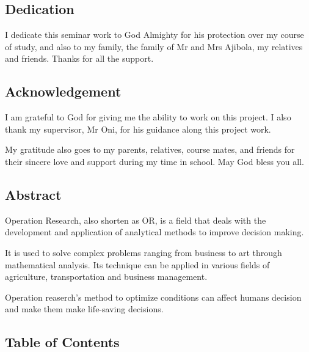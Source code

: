\documentclass{article}
\begin{document}
\newpage

\begin{center}
	\subsection{Dedication}
\end{center}


I dedicate this seminar work to God Almighty for his protection over my course of study, and also to my family, the family of Mr and Mrs Ajibola, my relatives and friends. Thanks for all the support.

\newpage

\begin{center}
	\subsection{Acknowledgement}
\end{center}

I am grateful to God for giving me the ability to work on this project. I also thank my supervisor, Mr Oni, for his guidance along this project work.

My gratitude also goes to my parents, relatives, course mates, and friends for their sincere love and support during my time in school. May God bless you all.

\newpage

\begin{center}
	\subsection{Abstract}
\end{center}


Operation Research, also shorten as OR, is a field that deals with the development and application of analytical methods to improve decision making. 

It is used to solve complex problems ranging from business to art through mathematical analysis. Its technique can be applied in various fields of agriculture, transportation and business management.

Operation reaserch's method to optimize conditions can affect humans decision and make them make life-saving decisions.

\newpage

\subsection{Table of Contents}
\tableofcontents
\end{document}
